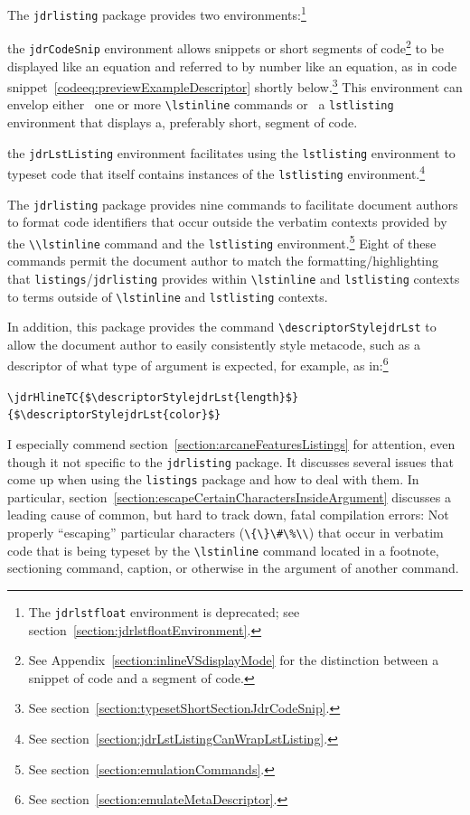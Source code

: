 \documentclass[12pt,table,final]{article}%
\DeclareRobustCommand{\escapableCharactersJdrLst}{\lstinline|\{\}\#\%\\|\xspace}
\begin{document}
The \lstinline$jdrlisting$ package provides two environments:\footnote{The \lstinline|jdrlstfloat| environment is deprecated; see section~\ref{section:jdrlstfloatEnvironment}.}
\begin{jdr_itemize}
  \item the \lstinline|jdrCodeSnip| environment allows snippets or short segments of code\footnote{See Appendix~\ref{section:inlineVSdisplayMode} for the distinction between a snippet of code and a segment of code.} to be displayed like an equation and referred to by number like an equation, as in code snippet~\ref{codeeq:previewExampleDescriptor} shortly below.\footnote{See section~\ref{section:typesetShortSectionJdrCodeSnip}.} This environment can envelop either ~one or more \lstinline|\lstinline| commands or ~a \lstinline|lstlisting| environment that displays a, preferably short, segment of code.
  \item the \lstinline|jdrLstListing| environment facilitates using the \lstinline|lstlisting| environment to typeset code that itself contains instances of the \lstinline|lstlisting| environment.\footnote{See section~\ref{section:jdrLstListingCanWrapLstListing}.}
\end{jdr_itemize}

The \lstinline$jdrlisting$ package provides nine commands to facilitate document authors to format code identifiers that occur outside the verbatim contexts provided by the \mbox{\lstinline$\\lstinline$} command and the \lstinline$lstlisting$ environment.\footnote{See section~\ref{section:emulationCommands}.} Eight of these commands permit the document author to match the formatting/highlighting that \lstinline$listings$/\lstinline$jdrlisting$ provides within \lstinline$\lstinline$ and \lstinline$lstlisting$ contexts to terms outside of \lstinline$\lstinline$ and \lstinline$lstlisting$ contexts.

In addition, this package provides the command \lstinline$\descriptorStylejdrLst$ to allow the document author to easily consistently style metacode, such as a descriptor of what type of argument is expected, for example, as in:\footnote{See section~\ref{section:emulateMetaDescriptor}.}
\begin{jdrCodeSnip}
\label{codeeq:previewExampleDescriptor}
\lstinline[mathescape]|\jdrHlineTC{$\descriptorStylejdrLst{length}$}{$\descriptorStylejdrLst{color}$}|
\end{jdrCodeSnip}

I especially commend section~\ref{section:arcaneFeaturesListings} for attention, even though it not specific to the \lstinline|jdrlisting| package. It discusses several issues that come up when using the \mbox{\lstinline|listings|} package and how to deal with them. In particular, section~\ref{section:escapeCertainCharactersInsideArgument} discusses a leading cause of common, but hard to track down, fatal compilation errors: Not properly ``escaping'' particular characters (\escapableCharactersJdrLst) that occur in verbatim code that is being typeset by the \lstinline|\lstinline| command located in a footnote, sectioning command, caption, or otherwise in the argument of another command.
\end{document}
